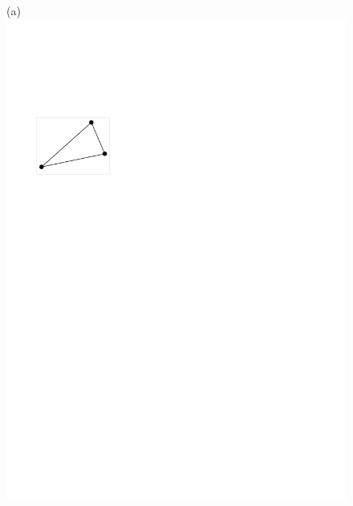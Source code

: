 \documentclass[twoside,a4paper,fleqn,12pt]{book}
\begin{document}
\begin{figure}[h]
  \centering
  (a) \includegraphics[scale=0.8]{triraster1}
  \qquad

\end{figure}
\end{document}

